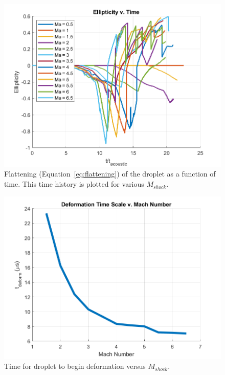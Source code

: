 \documentclass{UCF_ETD}
\begin{document}
\begin{figure}
\centering
\includegraphics[width=\textwidth]{Figures/Ellipticity_v_Ma.png}
\caption{Flattening (Equation~\ref{eq:flattening}) of the droplet as a function of time. This time history is plotted for various $M_{shock}$.}
\label{fig:transientFlattening}
\end{figure}

\begin{figure}
\centering
\includegraphics[width=\textwidth]{Figures/Deformation_time_scale_v_Ma.png}
\caption{Time for droplet to begin deformation versus $M_{shock}$.}
\label{fig:def_time_scale}
\end{figure}
\end{document}
